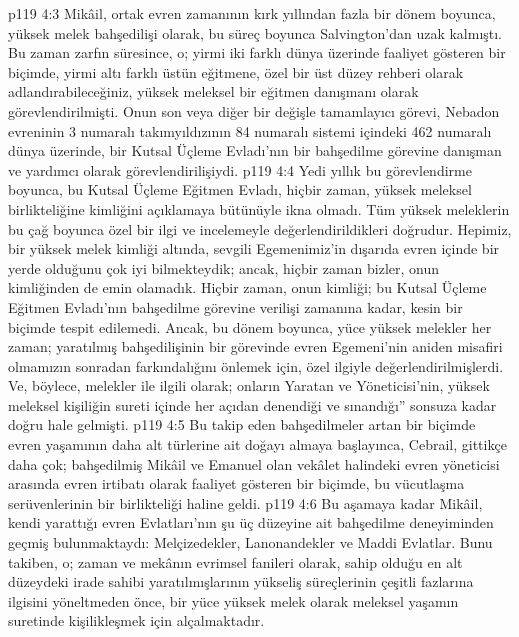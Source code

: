 \vs p119 4:3 Mikâil, ortak evren zamanının kırk yıllından fazla bir dönem boyunca, yüksek melek bahşedilişi olarak, bu süreç boyunca Salvington’dan uzak kalmıştı. Bu zaman zarfın süresince, o; yirmi iki farklı dünya üzerinde faaliyet gösteren bir biçimde, yirmi altı farklı üstün eğitmene, özel bir üst düzey rehberi olarak adlandırabileceğiniz, yüksek meleksel bir eğitmen danışmanı olarak görevlendirilmişti. Onun son veya diğer bir değişle tamamlayıcı görevi, Nebadon evreninin 3 numaralı takımyıldızının 84 numaralı sistemi içindeki 462 numaralı dünya üzerinde, bir Kutsal Üçleme Evladı’nın bir bahşedilme görevine danışman ve yardımcı olarak görevlendirilişiydi.
\vs p119 4:4 Yedi yıllık bu görevlendirme boyunca, bu Kutsal Üçleme Eğitmen Evladı, hiçbir zaman, yüksek meleksel birlikteliğine kimliğini açıklamaya bütünüyle ikna olmadı. Tüm yüksek meleklerin bu çağ boyunca özel bir ilgi ve incelemeyle değerlendirildikleri doğrudur. Hepimiz, bir yüksek melek kimliği altında, sevgili Egemenimiz’in dışarıda evren içinde bir yerde olduğunu çok iyi bilmekteydik; ancak, hiçbir zaman bizler, onun kimliğinden de emin olamadık. Hiçbir zaman, onun kimliği; bu Kutsal Üçleme Eğitmen Evladı’nın bahşedilme görevine verilişi zamanına kadar, kesin bir biçimde tespit edilemedi. Ancak, bu dönem boyunca, yüce yüksek melekler her zaman; yaratılmış bahşedilişinin bir görevinde evren Egemeni’nin aniden misafiri olmamızın sonradan farkındalığını önlemek için, özel ilgiyle değerlendirilmişlerdi. Ve, böylece, melekler ile ilgili olarak; onların Yaratan ve Yöneticisi’nin, yüksek meleksel kişiliğin sureti içinde her açıdan denendiği ve sınandığı” sonsuza kadar doğru hale gelmişti.
\vs p119 4:5 Bu takip eden bahşedilmeler artan bir biçimde evren yaşamının daha alt türlerine ait doğayı almaya başlayınca, Cebrail, gittikçe daha çok; bahşedilmiş Mikâil ve Emanuel olan vekâlet halindeki evren yöneticisi arasında evren irtibatı olarak faaliyet gösteren bir biçimde, bu vücutlaşma serüvenlerinin bir birlikteliği haline geldi.
\vs p119 4:6 Bu aşamaya kadar Mikâil, kendi yarattığı evren Evlatları’nın şu üç düzeyine ait bahşedilme deneyiminden geçmiş bulunmaktaydı: Melçizedekler, Lanonandekler ve Maddi Evlatlar. Bunu takiben, o; zaman ve mekânın evrimsel fanileri olarak, sahip olduğu en alt düzeydeki irade sahibi yaratılmışlarının yükseliş süreçlerinin çeşitli fazlarına ilgisini yöneltmeden önce, bir yüce yüksek melek olarak meleksel yaşamın suretinde kişilikleşmek için alçalmaktadır.
